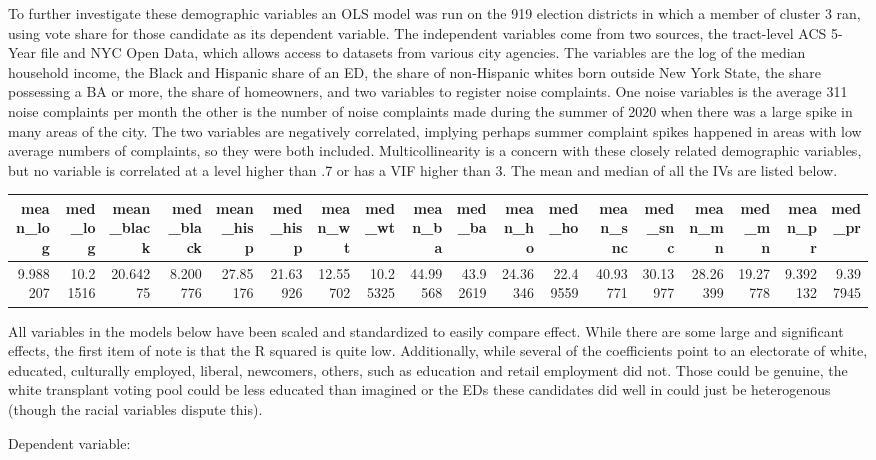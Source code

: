 \documentclass[
  letterpaper,
  DIV=11,
  numbers=noendperiod]{scrartcl}
\begin{document}
To further investigate these demographic variables an OLS model was run
on the 919 election districts in which a member of cluster 3 ran, using
vote share for those candidate as its dependent variable. The
independent variables come from two sources, the tract-level ACS 5-Year
file and NYC Open Data, which allows access to datasets from various
city agencies. The variables are the log of the median household income,
the Black and Hispanic share of an ED, the share of non-Hispanic whites
born outside New York State, the share possessing a BA or more, the
share of homeowners, and two variables to register noise complaints. One
noise variables is the average 311 noise complaints per month the other
is the number of noise complaints made during the summer of 2020 when
there was a large spike in many areas of the city. The two variables are
negatively correlated, implying perhaps summer complaint spikes happened
in areas with low average numbers of complaints, so they were both
included. Multicollinearity is a concern with these closely related
demographic variables, but no variable is correlated at a level higher
than .7 or has a VIF higher than 3. The mean and median of all the IVs
are listed below.

\begin{longtable}{rrrrrrrrrrrrrrrrrr}
\toprule
mean\_log & med\_log & mean\_black & med\_black & mean\_hisp & med\_hisp & mean\_wt & med\_wt & mean\_ba & med\_ba & mean\_ho & med\_ho & mean\_snc & med\_snc & mean\_mn & med\_mn & mean\_pr & med\_pr \\ 
\midrule
9.988207 & 10.21516 & 20.64275 & 8.200776 & 27.85176 & 21.63926 & 12.55702 & 10.25325 & 44.99568 & 43.92619 & 24.36346 & 22.49559 & 40.93771 & 30.13977 & 28.26399 & 19.27778 & 9.392132 & 9.397945 \\ 
\bottomrule
\end{longtable}

All variables in the models below have been scaled and standardized to
easily compare effect. While there are some large and significant
effects, the first item of note is that the R squared is quite low.
Additionally, while several of the coefficients point to an electorate
of white, educated, culturally employed, liberal, newcomers, others,
such as education and retail employment did not. Those could be genuine,
the white transplant voting pool could be less educated than imagined or
the EDs these candidates did well in could just be heterogenous (though
the racial variables dispute this).

Dependent variable:
\end{document}
